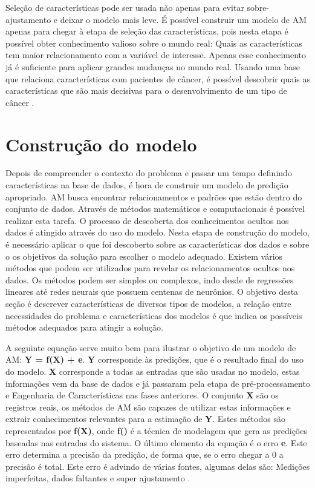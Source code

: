 Seleção de características pode ser usada não apenas para evitar sobre-ajustamento e deixar o modelo mais leve. É possível construir um modelo de AM apenas para chegar à etapa de seleção das características, pois nesta etapa é possível obter conhecimento valioso sobre o mundo real: Quais as características tem maior relacionamento com a variável de interesse. Apenas esse conhecimento já é suficiente para aplicar grandes mudanças no mundo real. Usando uma base que relaciona características com pacientes de câncer, é possível descobrir quais as características que são mais decisivas para o desenvolvimento de um tipo de câncer \cite{real2013}.

\section{Construção do modelo}
Depois de compreender o contexto do problema e passar um tempo definindo características na base de dados, é hora de construir um modelo de predição apropriado. AM busca encontrar relacionamentos e padrões que estão dentro do conjunto de dados. Através de métodos matemáticos e computacionais é possível realizar esta tarefa. O processo de descoberta dos conhecimentos ocultos nos dados é atingido através do uso do modelo. Nesta etapa de construção do modelo, é necessário aplicar o que foi descoberto sobre as características dos dados e sobre o os objetivos da solução para escolher o modelo adequado. Existem vários métodos que podem ser utilizados para revelar os relacionamentos ocultos nos dados. Os métodos podem ser simples ou complexos, indo desde de regressões lineares até redes neurais que possuem centenas de neurônios. O objetivo desta seção é descrever características de diversos tipos de modelos, a relação entre necessidades do problema e características dos modelos é que indica os possíveis métodos adequados para atingir a solução. 

A seguinte equação serve muito bem para ilustrar o objetivo de um modelo de AM: \textbf{ Y = f(X) + e}. \textbf{Y} corresponde às predições, que é o resultado final do uso do modelo. \textbf{X} corresponde a todas as entradas que são usadas no modelo, estas informações vem da base de dados e já passaram pela etapa de pré-processamento e Engenharia de Características nas fases anteriores. O conjunto \textbf{X} são os registros reais, os métodos de AM são capazes de utilizar estas informações e extrair conhecimentos relevantes para a estimação de \textbf{Y}. Estes  métodos são representados por \textbf{f(X)}, onde \textbf{f()} é a técnica de modelagem que gera as predições baseadas nas entradas do sistema. O último elemento da equação é o erro \textbf{e}. Este erro determina a precisão da predição, de forma que, se o erro chegar a 0 a precisão é total. Este erro é advindo de várias fontes, algumas delas são: Medições imperfeitas, dados faltantes e super ajustamento \cite{real2013}.

